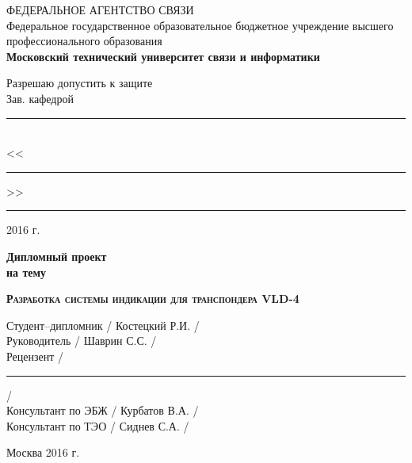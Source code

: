 \begin{titlepage}
  \newpage

  \begin{center}
    ФЕДЕРАЛЬНОЕ АГЕНТСТВО СВЯЗИ \\
    \vspace{1cm}
    Федеральное государственное образовательное бюджетное учреждение высшего
    профессионального образования\\
    \textbf{Московский технический университет связи и информатики}
  \end{center}

  \vspace{1.5em}

  \hspace{-1cm}\begin{minipage}{0.35\textwidth}
    \begin{center}
      Разрешаю допустить к защите \\
      Зав. кафедрой \\
    \end{center}
    \vspace{-1.0em}
    \rule{\textwidth}{.1pt} \\
    <<\rule{2em}{.1pt}>> \rule{6em}{.1pt} 2016 г.
  \end{minipage}
  \vfill

  \begin{center}
    \Huge\bfseries Дипломный проект \\ на тему
  \end{center}

  \vspace{0.5em}

  \begin{center}
    \textsc{\textbf{\Large Разработка системы индикации для транспондера VLD-4}}
  \end{center}

  \vfill

  \begin{flushleft}
    Студент--дипломник \hrulefill / Костецкий Р.И. / \\
    \vspace{1.5em}
    Руководитель \hrulefill / Шаврин С.С. /\\
    \vspace{1.5em}
    Рецензент \hrulefill  / \rule{6em}{.1pt} /\\
    \vspace{1.5em}
    Консультант по ЭБЖ \hrulefill / Курбатов В.А. /\\
    \vspace{1.5em}
    Консультант по ТЭО \hrulefill / Сиднев С.А. /\\
    \vspace{1.5em}
  \end{flushleft}

  \vspace{\fill}

  \begin{center}
    Москва 2016 г.
  \end{center}

\end{titlepage}